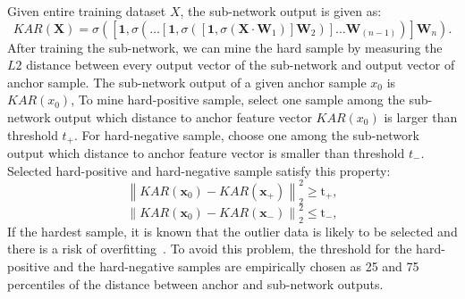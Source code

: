 Given entire training dataset $X$, the sub-network output is given as: 
\begin{equation}
    KAR\left(\mathbf{X}\right)=\sigma\left(\left[\mathbf{1},\sigma\left(\dots\left[\mathbf{1},\sigma\left(\left[\mathbf{1},\sigma\left(\mathbf{X}\cdot\mathbf{W}_{1}\right)\right]\mathbf{W}_{2}\right)\right]\dots\mathbf{W}_{(n-1)}\right)\right]\mathbf{W}_{n}\right).
\end{equation}
After training the sub-network, we can mine the hard sample by measuring the $L2$ distance between every output vector of the sub-network and output vector of anchor sample.
The sub-network output of a given anchor sample $x_0$ is $KAR(x_0)$, To mine hard-positive sample, select one sample among the sub-network output which distance to anchor feature vector $KAR(x_0)$ is larger than threshold $t_+$. For hard-negative sample, choose one among the sub-network output which distance to anchor feature vector is smaller than threshold $t_-$.
Selected hard-positive and hard-negative sample satisfy this property:
\begin{equation}
    {\left\| {{KAR\left(\mathbf{x}_{0}\right)} - {KAR\left(\mathbf{x}_{+}\right)}} \right\|_2^2} \geq \mathrm{t}_{+}, 
    \label{thres_pos}
\end{equation}
\begin{equation}
    {\left\| {{KAR\left(\mathbf{x}_{0}\right)} - {KAR\left(\mathbf{x}_{-}\right)}} \right\|_2^2} \leq \mathrm{t}_{-},\label{thres_neg}
\end{equation}
If the hardest sample, it is known that the outlier data is likely to be selected and there is a risk of overfitting~\cite{schroff2015facenet}.
To avoid this problem, the threshold for the hard-positive and the hard-negative samples are empirically chosen as 25 and 75 percentiles of the distance between anchor and sub-network outputs.


